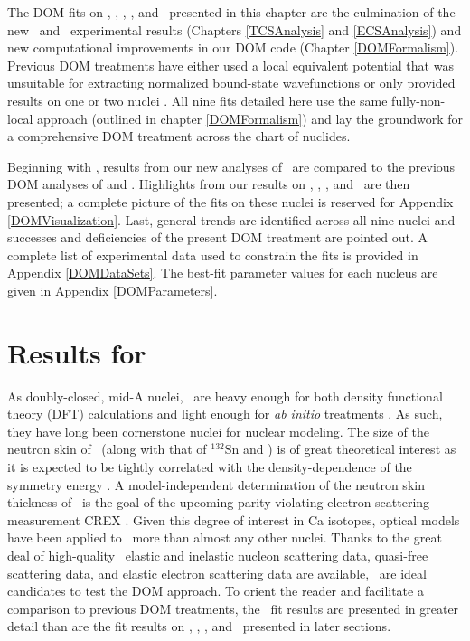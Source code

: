 The \gls{DOM} fits on \oSixEight, \caAughtEight, \niEightFour,
\snTwelveFour, and \pbEight\ presented in
this chapter are the culmination of the new \tot\ and \el\ experimental results
(Chapters \ref{TCSAnalysis} and \ref{ECSAnalysis})
and new computational improvements in our DOM code (Chapter \ref{DOMFormalism}).
Previous DOM treatments have either used a
local equivalent potential \cite{Charity2006, Mueller2011} that was unsuitable for extracting
normalized bound-state wavefunctions or only provided results on one or
two nuclei \cite{Mahzoon2017, Atkinson2018}. All nine fits detailed here use the
same fully-non-local approach
(outlined in chapter \ref{DOMFormalism}) and lay the groundwork for a comprehensive DOM treatment 
across the chart of nuclides.

Beginning with \caForty, results from our new analyses of
\caAughtEight\ are compared to the previous
DOM analyses of \cite{MahzoonPhDThesis} and 
\cite{Atkinson2018}. Highlights from our results on \oSixEight, \niEightFour, \snTwelveFour,
and \pbEight\ are then presented; a complete picture of the fits on these nuclei
is reserved for Appendix \ref{DOMVisualization}. Last, general trends are identified across
all nine nuclei and successes and deficiencies of the present DOM treatment are pointed out.
A complete list of experimental data used to constrain the fits is provided in Appendix
\ref{DOMDataSets}. The best-fit parameter values for each nucleus are given in Appendix
\ref{DOMParameters}.

\section{Results for \caAughtEight}
As doubly-closed, mid-A nuclei, \caAughtEight\ are heavy enough for both density functional
theory (DFT) calculations \cite{Piekarewicz2012} and light enough for \textit{ab initio} 
treatments \cite{Hagen2016}. As such, they have long been cornerstone nuclei for
nuclear modeling. The size of the neutron skin of \caEight\ (along with that of $^{132}$Sn and
\pbEight) is of great theoretical interest as it is expected to be tightly correlated with the
density-dependence of the symmetry energy \cite{Fattoyev2012}. A model-independent determination
of the neutron skin thickness of \caEight\ is the goal of the upcoming parity-violating
electron scattering measurement CREX \cite{Horowitz2014}. Given this degree of interest in Ca
isotopes, optical models have been applied to
\caAughtEight\ more than almost any other nuclei. Thanks to the
great deal of high-quality \caAughtEight\ 
elastic and inelastic nucleon scattering data, quasi-free scattering data, and elastic electron
scattering data are available, \caAughtEight\ are ideal
candidates to test the DOM approach. To orient the
reader and facilitate a comparison to previous DOM treatments, the \caAughtEight\ fit results are
presented in greater detail than are the fit results on \oSixEight, \niEightFour,
\snTwelveFour, and \pbEight\ presented in later sections.

